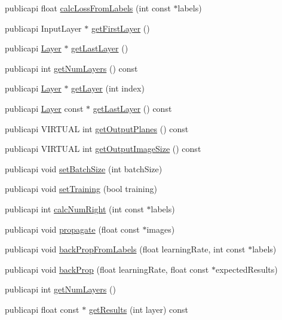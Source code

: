 \begin{DoxyCompactItemize}
publicapi float \hyperlink{classNeuralNet_abd31a3135dcdeaf91eb6ee7be58a676c}{calc\-Loss\-From\-Labels} (int const $\ast$labels)
\item 
publicapi Input\-Layer $\ast$ \hyperlink{classNeuralNet_a2b2ea77732a5969b70453a110c4a10e8}{get\-First\-Layer} ()
\item 
publicapi \hyperlink{classLayer}{Layer} $\ast$ \hyperlink{classNeuralNet_a21256dd9a2c7834be50f4d84e2c9e947}{get\-Last\-Layer} ()
\item 
publicapi int \hyperlink{classNeuralNet_ab0914b73f5ecd0291f2ce2070d824757}{get\-Num\-Layers} () const 
\item 
publicapi \hyperlink{classLayer}{Layer} $\ast$ \hyperlink{classNeuralNet_ac1909a900477ba46c7284cfbfa262ead}{get\-Layer} (int index)
\item 
publicapi \hyperlink{classLayer}{Layer} const $\ast$ \hyperlink{classNeuralNet_a92eb5fa55ec81929637d9c5884de432a}{get\-Last\-Layer} () const 
\item 
publicapi V\-I\-R\-T\-U\-A\-L int \hyperlink{classNeuralNet_ab32d1d2225a84dfeaee28fdf57d7eed6}{get\-Output\-Planes} () const 
\item 
publicapi V\-I\-R\-T\-U\-A\-L int \hyperlink{classNeuralNet_a8b2a3f84373bcd1960275306b24a89b3}{get\-Output\-Image\-Size} () const 
\item 
publicapi void \hyperlink{classNeuralNet_a0d31109594880ff7c7f838ccc5d4609d}{set\-Batch\-Size} (int batch\-Size)
\item 
publicapi void \hyperlink{classNeuralNet_a5566ed539198d3110cf0e30e81ad7b5d}{set\-Training} (bool training)
\item 
publicapi int \hyperlink{classNeuralNet_aa2adb751a3fd02be1b282edb1c653261}{calc\-Num\-Right} (int const $\ast$labels)
\item 
publicapi void \hyperlink{classNeuralNet_aed06c0fdd42fd7b6f9673bc0d498eb0d}{propagate} (float const $\ast$images)
\item 
publicapi void \hyperlink{classNeuralNet_a886970b2efbd3b57e812fd1553760669}{back\-Prop\-From\-Labels} (float learning\-Rate, int const $\ast$labels)
\item 
publicapi void \hyperlink{classNeuralNet_a25c47bc123ef8a279054af26dd5d0f5c}{back\-Prop} (float learning\-Rate, float const $\ast$expected\-Results)
\item 
publicapi int \hyperlink{classNeuralNet_a7974820a72d22f328ae20bf53bdd0f13}{get\-Num\-Layers} ()
\item 
publicapi float const $\ast$ \hyperlink{classNeuralNet_a82c0bb751508ad07ec9ca57c98615828}{get\-Results} (int layer) const 

\end{DoxyCompactItemize}
